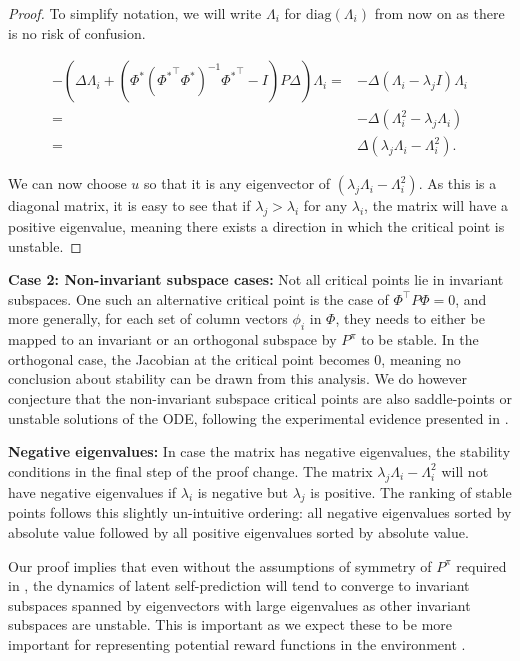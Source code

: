 \begin{proof}
To simplify notation, we will write $\Lambda_i$ for $\mathrm{diag}(\Lambda_i)$ from now on as there is no risk of confusion.

\begin{align}
    -\left(\Delta \Lambda_i + \left(\Phi^*\left({\Phi^*}^\top \Phi^*\right)^{-1}{\Phi^*}^\top - I\right) P \Delta\right)\Lambda_i = &- \Delta \left(\Lambda_i - \lambda_j I\right) \Lambda_i\\
    = &-\Delta \left(\Lambda_i^2 - \lambda_j \Lambda_i\right) \\
    = &\Delta \left(\lambda_j \Lambda_i - \Lambda_i^2\right).
\end{align}

We can now choose $u$ so that it is any eigenvector of $\left(\lambda_j \Lambda_i - \Lambda_i^2\right)$. As this is a diagonal matrix, it is easy to see that if $\lambda_j > \lambda_i$ for any $\lambda_i$, the matrix will have a positive eigenvalue, meaning there exists a direction in which the critical point is unstable.

\end{proof}
\textbf{Case 2: Non-invariant subspace cases:} Not all critical points lie in invariant subspaces.
One such an alternative critical point is the case of $\Phi^\top P \Phi = 0$, and more generally, for each set of column vectors $\phi_i$ in $\Phi$, they needs to either be mapped to an invariant or an orthogonal subspace by $P^\pi$ to be stable.
In the orthogonal case, the Jacobian at the critical point becomes 0, meaning no conclusion about stability can be drawn from this analysis.
We do however conjecture that the non-invariant subspace critical points are also saddle-points or unstable solutions of the ODE, following the experimental evidence presented in \textcite{tang2022understanding}.

\textbf{Negative eigenvalues:} In case the matrix has negative eigenvalues, the stability conditions in the final step of the proof change. The matrix $\lambda_j\Lambda_i - \Lambda_i^2$ will not have negative eigenvalues if $\lambda_i$ is negative but $\lambda_j$ is positive. The ranking of stable points follows this slightly un-intuitive ordering: all negative eigenvalues sorted by absolute value followed by all positive eigenvalues sorted by absolute value.



Our proof implies that even without the assumptions of symmetry of $P^\pi$ required in \textcite{tang2022understanding}, the dynamics of latent self-prediction will tend to converge to invariant subspaces spanned by eigenvectors with large eigenvalues as other invariant subspaces are unstable.
This is important as we expect these to be more important for representing potential reward functions in the environment \parencite{lelan2023bootstrapped}. 


